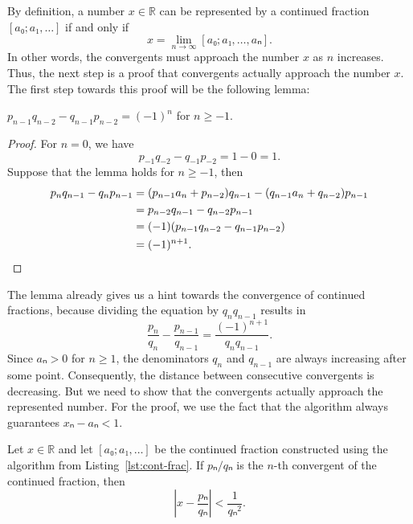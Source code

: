 By definition,
a number $x ∈ ℝ$ can be represented by a continued fraction $[a₀; a₁, …]$
if and only if
\[
  x = \lim_{n → ∞} [a₀; a₁, …, aₙ].
\]
In other words, the convergents must approach the number $x$ as $n$ increases.
Thus, the next step is a proof that convergents actually approach the number $x$.
The first step towards this proof will be the following lemma:

\begin{lemma}
  \label{lem:cf-det}
  $p_{n-1} q_{n-2} - q_{n-1} p_{n-2} = (-1)^n$ for $n ≥ -1$.
\end{lemma}

\begin{proof}
  For $n = 0$, we have
  \[
    p_{-1} q_{-2} - q_{-1} p_{-2} = 1 - 0 = 1.
  \]
  Suppose that the lemma holds for $n ≥ -1$, then
  \begin{align*}
    p_n q_{n-1} - q_n p_{n-1}
    & = (p_{n-1} a_n + p_{n-2}) q_{n-1} - (q_{n-1} a_n + q_{n-2}) p_{n-1} \\
    & = p_{n-2} q_{n-1} - q_{n-2} p_{n-1} \\
    & = (-1) (p_{n-1} q_{n-2} - q_{n-1} p_{n-2}) \\
    & = (-1)^{n+1}. \qedhere
  \end{align*}
\end{proof}

The lemma already gives us a hint towards the convergence of continued fractions,
because dividing the equation by $q_n q_{n-1}$ results in
\[
  \frac{p_n}{q_n} - \frac{p_{n-1}}{q_{n-1}} = \frac{(-1)^{n+1}}{q_n q_{n-1}}.
\]
Since $aₙ > 0$ for $n ≥ 1$, the denominators $q_n$ and $q_{n-1}$ are always
increasing after some point.
Consequently, the distance between consecutive convergents is decreasing.
But we need to show that the convergents actually approach the represented number.
For the proof, we use the fact that the algorithm always guarantees $xₙ - aₙ < 1$.

\begin{lemma}
  \label{lem:cf-approx}
  Let $x ∈ ℝ$ and let $[a₀; a₁, …]$ be the continued fraction constructed using the algorithm from Listing~\ref{lst:cont-frac}.
  If $pₙ/qₙ$ is the $n$-th convergent of the continued fraction, then
  \[
    \left| x - \frac{pₙ}{qₙ} \right| < \frac{1}{qₙ^2}.
  \]
\end{lemma}

